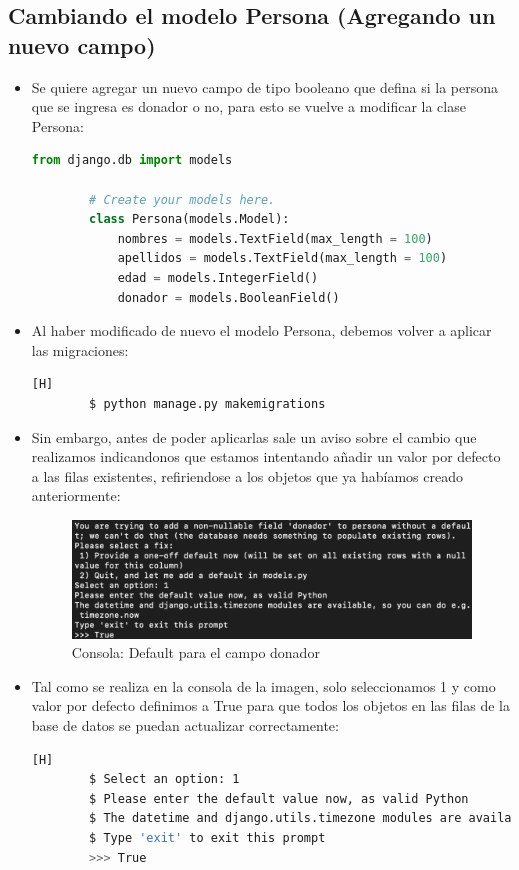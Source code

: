 \documentclass{article}
\begin{document}
        \subsection{Cambiando el modelo Persona (Agregando un nuevo campo)}
        \begin{itemize}
            \item Se quiere agregar un nuevo campo de tipo booleano que defina si la persona que se ingresa es donador o no, para esto se vuelve a modificar la clase Persona:
	
        \begin{lstlisting}[language=Python, caption={Modificación del modelo Persona}]
        from django.db import models
        
        # Create your models here.
        class Persona(models.Model):
            nombres = models.TextField(max_length = 100)
            apellidos = models.TextField(max_length = 100)
            edad = models.IntegerField()
            donador = models.BooleanField()
        \end{lstlisting}

            \item Al haber modificado de nuevo el modelo Persona, debemos volver a aplicar las migraciones:
        
        \begin{lstlisting}[language=bash,caption={Makemigrations}][H]
        $ python manage.py makemigrations
        \end{lstlisting}
            \item Sin embargo, antes de poder aplicarlas sale un aviso sobre el cambio que realizamos indicandonos que estamos intentando añadir un valor por defecto a las filas existentes, refiriendose a los objetos que ya habíamos creado anteriormente:

        \begin{figure}[H]
            \centering
            \includegraphics[width=0.8\linewidth]{img/DonadorDefault.png}
            \caption{Consola: Default para el campo donador}
            \label{fig:enter-label}
        \end{figure}
            \item Tal como se realiza en la consola de la imagen, solo seleccionamos 1 y como valor por defecto definimos a True para que todos los objetos en las filas de la base de datos se puedan actualizar correctamente:
        \begin{lstlisting}[language=bash,caption={Migrate y runserver}][H]
        $ Select an option: 1
        $ Please enter the default value now, as valid Python
        $ The datetime and django.utils.timezone modules are available, so you can do e.g.timezone.now
        $ Type 'exit' to exit this prompt
        >>> True
        \end{lstlisting}


\end{itemize}
\end{document}
